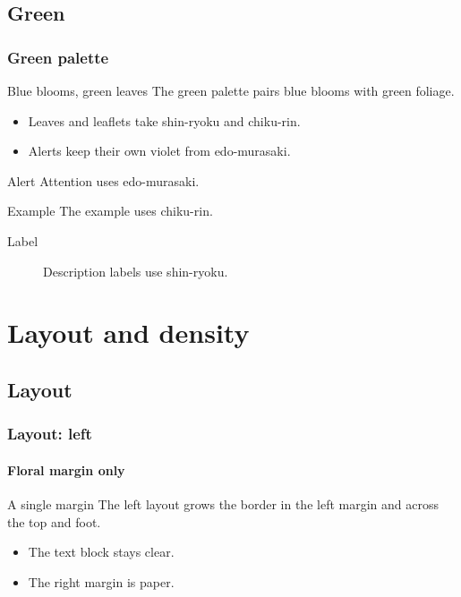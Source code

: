 \documentclass[aspectratio=169]{beamer}
\begin{document}
\subsection{Green}

\begin{frame}
  \frametitle{Green palette}
  \begin{block}{Blue blooms, green leaves}
    The green palette pairs blue blooms with green foliage.
  \end{block}
  \begin{itemize}
    \item Leaves and leaflets take shin-ryoku and chiku-rin.
    \item Alerts keep their own violet from edo-murasaki.
  \end{itemize}
  \begin{alertblock}{Alert}
    \alert{Attention} uses edo-murasaki.
  \end{alertblock}
  \begin{exampleblock}{Example}
    The example uses chiku-rin.
  \end{exampleblock}
  \begin{description}
    \item[Label] Description labels use shin-ryoku.
  \end{description}
\end{frame}

\section{Layout and density}
\subsection{Layout}

\begin{frame}
  \frametitle{Layout: left}
  \framesubtitle{Floral margin only}
  \begin{block}{A single margin}
    The left layout grows the border in the left margin and across the top and foot.
  \end{block}
  \begin{itemize}
    \item The text block stays clear.
    \item The right margin is paper.
  \end{itemize}
\end{frame}
\end{document}
